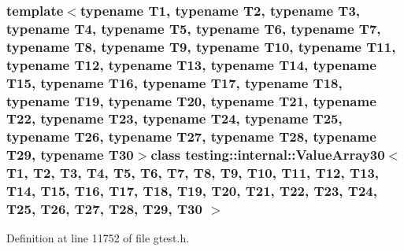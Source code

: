 \subsubsection*{template$<$typename T1, typename T2, typename T3, typename T4, typename T5, typename T6, typename T7, typename T8, typename T9, typename T10, typename T11, typename T12, typename T13, typename T14, typename T15, typename T16, typename T17, typename T18, typename T19, typename T20, typename T21, typename T22, typename T23, typename T24, typename T25, typename T26, typename T27, typename T28, typename T29, typename T30$>$class testing\-::internal\-::\-Value\-Array30$<$ T1, T2, T3, T4, T5, T6, T7, T8, T9, T10, T11, T12, T13, T14, T15, T16, T17, T18, T19, T20, T21, T22, T23, T24, T25, T26, T27, T28, T29, T30 $>$}



\-Definition at line 11752 of file gtest.\-h.



